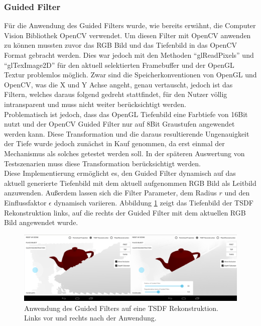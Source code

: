\subsubsection*{Guided Filter}

Für die Anwendung des Guided Filters wurde, wie bereits erwähnt, die Computer Vision Bibliothek OpenCV verwendet. Um diesen Filter mit OpenCV anwenden zu können mussten zuvor das RGB Bild und das Tiefenbild in das OpenCV Format gebracht werden. Dies war jedoch mit den Methoden \enquote{glReadPixels} und \enquote{glTexImage2D} für den aktuell selektierten Framebuffer und der OpenGL Textur problemlos möglich. Zwar sind die Speicherkonventionen von OpenGL und OpenCV, was die X und Y Achse angeht, genau vertauscht, jedoch ist das Filtern, welches daraus folgend gedreht stattfindet, für den Nutzer völlig intransparent und muss nicht weiter berücksichtigt werden.\\

Problematisch ist jedoch, dass das OpenGL Tiefenbild eine Farbtiefe von 16Bit nutzt und der OpenCV Guided Filter nur auf 8Bit Graustufen angewendet werden kann. Diese Transformation und die daraus resultierende Ungenauigkeit der Tiefe wurde jedoch zunächst in Kauf genommen, da erst einmal der Mechanismus als solches getestet werden soll. In der späteren Auswertung von Testszenarien muss diese Transformation berücksichtigt werden. \\

Diese Implementierung ermöglicht es, den Guided Filter dynamisch auf das aktuell generierte Tiefenbild mit dem aktuell aufgenommen RGB Bild als Leitbild anzuwenden. Außerdem lassen sich die Filter Parameter, dem Radius \(r\) und den Einflussfaktor \(\epsilon\) dynamisch variieren. Abbildung \ref{fig:filter-demo} zeigt das Tiefenbild der TSDF Rekonstruktion links, auf die rechts der Guided Filter mit dem aktuellen RGB Bild angewendet wurde. \\

\begin{figure}[h]
  \centering
	\includegraphics[width=1.0\textwidth]{content/images/implementation/filter-demo.png} 
  \caption{Anwendung des Guided Filters auf eine TSDF Rekonstruktion. Links vor und rechts nach der Anwendung.}
  \label{fig:filter-demo}
\end{figure}

